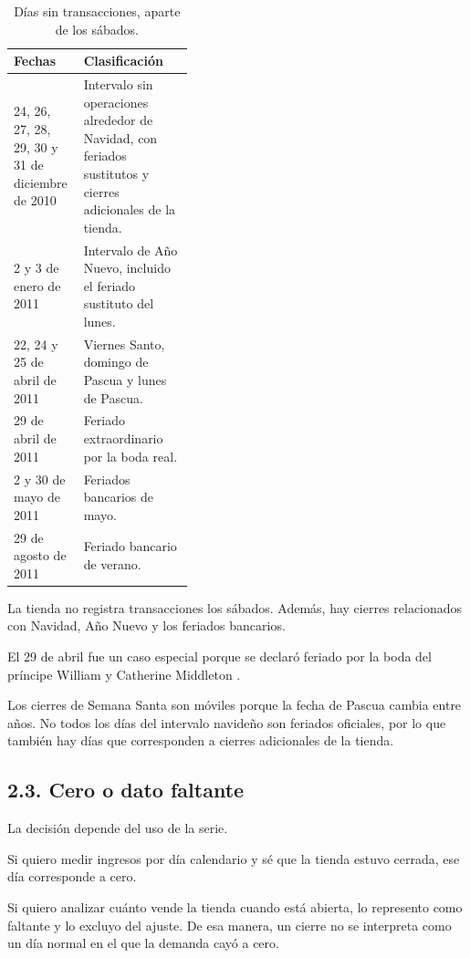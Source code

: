 \documentclass[11pt,letterpaper]{article}
\begin{document}
\begin{table}[H]
\centering
\small
\caption{Días sin transacciones, aparte de los sábados.}
\begin{tabularx}{\linewidth}{p{0.39\linewidth}X}
\toprule
Fechas & Clasificación\\
\midrule

24, 26, 27, 28, 29, 30 y 31 de diciembre de 2010
&
Intervalo sin operaciones alrededor de Navidad, con feriados sustitutos y cierres adicionales de la tienda.
\\

2 y 3 de enero de 2011
&
Intervalo de Año Nuevo, incluido el feriado sustituto del lunes.
\\

22, 24 y 25 de abril de 2011
&
Viernes Santo, domingo de Pascua y lunes de Pascua.
\\

29 de abril de 2011
&
Feriado extraordinario por la boda real.
\\

2 y 30 de mayo de 2011
&
Feriados bancarios de mayo.
\\

29 de agosto de 2011
&
Feriado bancario de verano.
\\

\bottomrule
\end{tabularx}
\end{table}

La tienda no registra transacciones los sábados. Además, hay cierres relacionados con Navidad, Año Nuevo y los feriados bancarios.

El 29 de abril fue un caso especial porque se declaró feriado por la boda del príncipe William y Catherine Middleton \cite{boda}.

Los cierres de Semana Santa son móviles porque la fecha de Pascua cambia entre años. No todos los días del intervalo navideño son feriados oficiales, por lo que también hay días que corresponden a cierres adicionales de la tienda.

\subsection*{2.3. Cero o dato faltante}

La decisión depende del uso de la serie.

Si quiero medir ingresos por día calendario y sé que la tienda estuvo cerrada, ese día corresponde a cero.

Si quiero analizar cuánto vende la tienda cuando está abierta, lo represento como faltante y lo excluyo del ajuste. De esa manera, un cierre no se interpreta como un día normal en el que la demanda cayó a cero.
\end{document}
